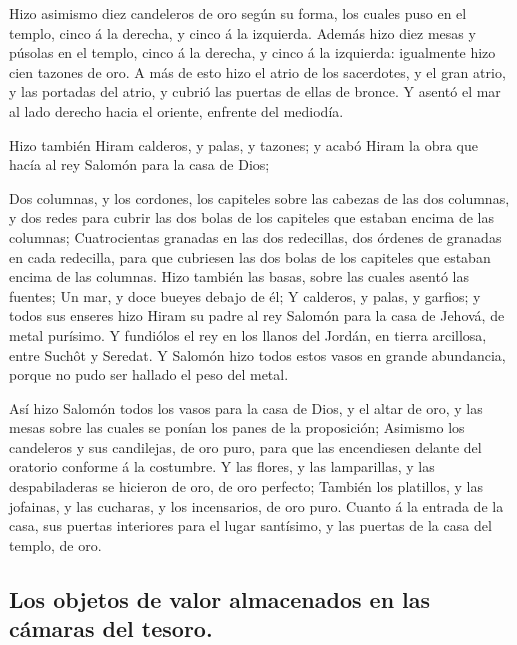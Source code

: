  Hizo asimismo diez candeleros de oro según su forma, los
cuales puso en el templo, cinco á la derecha, y cinco á la izquierda.
 Además hizo diez mesas y púsolas en el templo, cinco á la
derecha, y cinco á la izquierda: igualmente hizo cien tazones de oro.
 A más de esto hizo el atrio de los sacerdotes, y el gran
atrio, y las portadas del atrio, y cubrió las puertas de ellas de
bronce.  Y asentó el mar al lado derecho hacia el oriente,
enfrente del mediodía.

 Hizo también Hiram calderos, y palas, y tazones; y acabó
Hiram la obra que hacía al rey Salomón para la casa de Dios;

 Dos columnas, y los cordones, los capiteles sobre las
cabezas de las dos columnas, y dos redes para cubrir las dos bolas de
los capiteles que estaban encima de las columnas; 
Cuatrocientas granadas en las dos redecillas, dos órdenes de granadas en
cada redecilla, para que cubriesen las dos bolas de los capiteles que
estaban encima de las columnas.  Hizo también las basas,
sobre las cuales asentó las fuentes;  Un mar, y doce bueyes
debajo de él;  Y calderos, y palas, y garfios; y todos sus
enseres hizo Hiram su padre al rey Salomón para la casa de Jehová, de
metal purísimo.  Y fundiólos el rey en los llanos del
Jordán, en tierra arcillosa, entre Suchôt y Seredat.  Y
Salomón hizo todos estos vasos en grande abundancia, porque no pudo ser
hallado el peso del metal.

 Así hizo Salomón todos los vasos para la casa de Dios, y
el altar de oro, y las mesas sobre las cuales se ponían los panes de la
proposición;  Asimismo los candeleros y sus candilejas, de
oro puro, para que las encendiesen delante del oratorio conforme á la
costumbre.  Y las flores, y las lamparillas, y las
despabiladeras se hicieron de oro, de oro perfecto; 
También los platillos, y las jofainas, y las cucharas, y los
incensarios, de oro puro. Cuanto á la entrada de la casa, sus puertas
interiores para el lugar santísimo, y las puertas de la casa del templo,
de oro.

\hypertarget{los-objetos-de-valor-almacenados-en-las-cuxe1maras-del-tesoro.}{%
\subsection{Los objetos de valor almacenados en las cámaras del
tesoro.}\label{los-objetos-de-valor-almacenados-en-las-cuxe1maras-del-tesoro.}}


